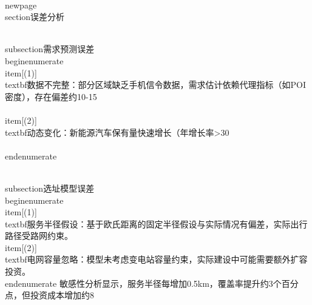 \\newpage
\\section{误差分析}

\\subsection{需求预测误差}
\\begin{enumerate}
    \\item[(1)] \\textbf{数据不完整}：部分区域缺乏手机信令数据，需求估计依赖代理指标（如POI密度），存在偏差约10-15\\%
    \\item[(2)] \\textbf{动态变化}：新能源汽车保有量快速增长（年增长率>30\\%
\\end{enumerate}

\\subsection{选址模型误差}
\\begin{enumerate}
    \\item[(1)] \\textbf{服务半径假设}：基于欧氏距离的固定半径假设与实际情况有偏差，实际出行路径受路网约束。
    \\item[(2)] \\textbf{电网容量忽略}：模型未考虑变电站容量约束，实际建设中可能需要额外扩容投资。
\\end{enumerate}
敏感性分析显示，服务半径每增加0.5km，覆盖率提升约3个百分点，但投资成本增加约8\\%
